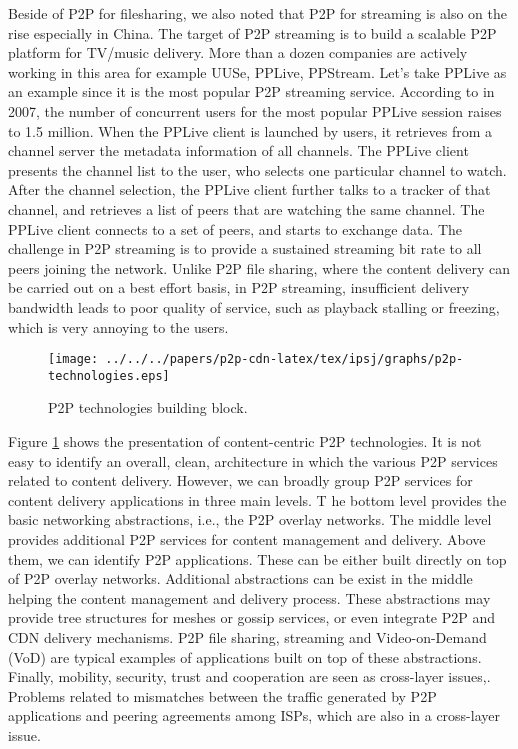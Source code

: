 Beside of P2P for filesharing, we also noted that P2P for streaming is also on the rise especially in China.
The target of P2P streaming is to build a scalable P2P platform for TV/music delivery. 
More than a dozen companies are actively working in this area for example UUSe, PPLive, PPStream. 
Let's take PPLive as an example since it is the most popular P2P streaming service.
According to \cite{} in 2007, the number of concurrent users for the most popular PPLive session raises to 1.5 million.
When the PPLive client is launched by users, it retrieves from a channel server the metadata information of all channels. 
The PPLive client presents the channel list to the user, who selects one particular channel to watch. 
After the channel selection, the PPLive client further talks to a tracker of that channel, and retrieves a list of peers that are watching the same channel. 
The PPLive client connects to a set of peers, and starts to exchange data. 
The challenge in P2P streaming is to provide a sustained streaming bit rate to all peers joining the network. 
Unlike P2P file sharing, where the content delivery can be carried out on a best effort basis, in P2P streaming, insufficient delivery bandwidth leads to poor quality of service, such as playback stalling or freezing, which is very annoying to the users.

\begin{figure}[tb]
\begin{center}
\texttt{[image: ../../../papers/p2p-cdn-latex/tex/ipsj/graphs/p2p-technologies.eps]}
\end{center}
\caption{P2P technologies building block.} 
\label{fig:p2ptech}
\end{figure}

Figure \ref{fig:p2ptech} shows the presentation of content-centric P2P technologies.
It is not easy to identify an overall, clean, architecture in which the various P2P services related to content delivery. 
However, we can broadly group P2P services for content delivery applications in three main levels. T
he bottom level provides the basic networking abstractions, i.e., the P2P overlay networks. 
The middle level provides additional P2P services for content management and delivery. 
Above them, we can identify P2P applications. 
These can be either built directly on top of P2P overlay networks. 
Additional abstractions can be exist in the middle helping the content management and delivery process.
These abstractions may provide tree structures for meshes or gossip services, or even integrate P2P and CDN delivery mechanisms. 
P2P file sharing, streaming and Video-on-Demand (VoD) are typical examples of applications built on top of these abstractions. 
Finally, mobility, security, trust and cooperation are seen as cross-layer issues,.
Problems related to mismatches between the traffic generated by P2P applications and peering agreements among ISPs, which are also in a cross-layer issue.

